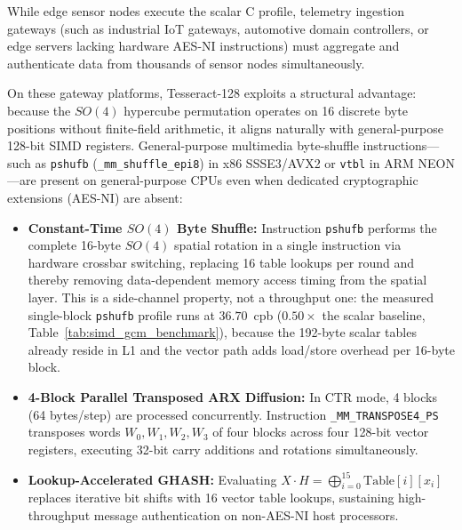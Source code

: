 \documentclass[10pt,twocolumn]{article}
\begin{document}
While edge sensor nodes execute the scalar C profile, telemetry ingestion gateways (such as industrial IoT gateways, automotive domain controllers, or edge servers lacking hardware AES-NI instructions) must aggregate and authenticate data from thousands of sensor nodes simultaneously. 

On these gateway platforms, Tesseract-128 exploits a structural advantage: because the $SO(4)$ hypercube permutation operates on 16 discrete byte positions without finite-field arithmetic, it aligns naturally with general-purpose 128-bit SIMD registers. General-purpose multimedia byte-shuffle instructions---such as \texttt{pshufb} (\texttt{\_mm\_shuffle\_epi8}) in x86 SSSE3/AVX2 or \texttt{vtbl} in ARM NEON---are present on general-purpose CPUs even when dedicated cryptographic extensions (AES-NI) are absent:
\begin{itemize}
    \item \textbf{Constant-Time $SO(4)$ Byte Shuffle:} Instruction \texttt{pshufb} performs the complete 16-byte $SO(4)$ spatial rotation in a single instruction via hardware crossbar switching, replacing 16 table lookups per round and thereby removing data-dependent memory access timing from the spatial layer. This is a side-channel property, not a throughput one: the measured single-block \texttt{pshufb} profile runs at $36.70$~cpb ($0.50\times$ the scalar baseline, Table~\ref{tab:simd_gcm_benchmark}), because the 192-byte scalar tables already reside in L1 and the vector path adds load/store overhead per 16-byte block.
    \item \textbf{4-Block Parallel Transposed ARX Diffusion:} In CTR mode, 4 blocks (64 bytes/step) are processed concurrently. Instruction \texttt{\_MM\_}\allowbreak\texttt{TRANSPOSE4\_PS} transposes words $W_0, W_1, W_2, W_3$ of four blocks across four 128-bit vector registers, executing 32-bit carry additions and rotations simultaneously.
    \item \textbf{Lookup-Accelerated GHASH:} Evaluating $X \cdot H = \bigoplus_{i=0}^{15} \text{Table}[i][x_i]$ replaces iterative bit shifts with 16 vector table lookups, sustaining high-throughput message authentication on non-AES-NI host processors.
\end{itemize}
\end{document}
